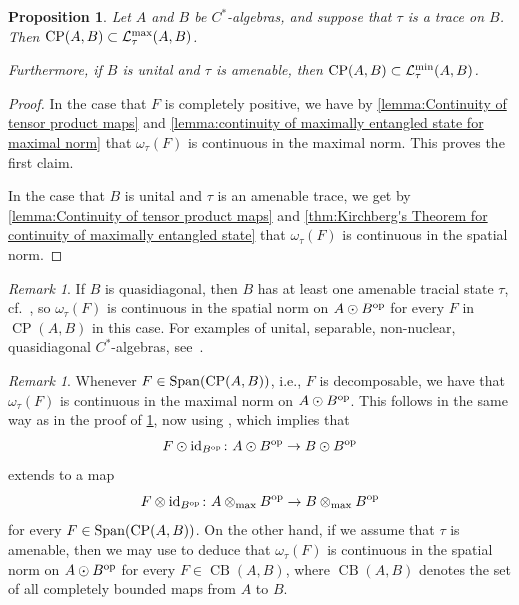 \documentclass[11pt, a4paper, oneside, final, reqno]{amsart}
\newcommand{\calL}{\mathcal{L}}
\newcommand{\CP}{\operatorname{CP}}
\newcommand{\CB}{\operatorname{CB}}
\theoremstyle{definition}
\theoremstyle{plain}
\newtheorem{proposition}[definition]{Proposition}
\theoremstyle{remark}
\newtheorem{remark}[definition]{Remark}
\numberwithin{equation}{section}
\begin{document}
\begin{proposition}\label{prop:cp maps have cont associated functional}
    Let $A$ and $B$ be $C^*$-algebras, and suppose that $\tau$ is a trace on $B$. Then $\CP(A,B) \subset \calL_\tau^{\rm max}(A,B)$.

    Furthermore, if $B$ is unital and $\tau$ is amenable, then $\CP(A,B) \subset \calL_\tau^{\rm min}(A,B)$.
\end{proposition}
\begin{proof}
    In the case that $F$ is completely positive, we have by \cref{lemma:Continuity of tensor product maps} and \cref{lemma:continuity of maximally entangled state for maximal norm} that $\omega_\tau(F)$ is continuous in the maximal norm. This proves the first claim.

    In the case that $B$ is unital and $\tau$ is an amenable trace, we get by \cref{lemma:Continuity of tensor product maps} and \cref{thm:Kirchberg's Theorem for continuity of maximally entangled state} that $\omega_\tau(F)$ is continuous in the spatial norm.
\end{proof}

\begin{remark}
    If $B$ is quasidiagonal, then $B$ has at least one amenable tracial state $\tau$, cf.~\cite[Proposition 7.1.16]{BO}, so $\omega_\tau(F)$ is continuous in the spatial norm on $A \odot B^{\rm op}$ for every $F$ in $\CP(A,B)$ in this case. For examples of unital, separable, non-nuclear, quasidiagonal $C^*$-algebras, see~\cite[Remark 7.3]{Pisier2020}.
\end{remark}

\begin{remark}
    Whenever $F \in {\rm Span}(\CP(A,B))$, i.e., $F$ is decomposable, we have that $\omega_\tau(F)$ is continuous in the maximal norm on $A \odot B^{\rm op}$. This follows in the same way as in the proof of \cref{prop:cp maps have cont associated functional}, now using \cite[Proposition 6.11]{GP}, which implies that
    \begin{equation*}
        F \odot \textup{id}_{B^\textup{op}} \colon A \odot B^\textup{op} \to B \odot B^\textup{op}
    \end{equation*}
    extends to a map
    \begin{equation*}
        F \otimes \textup{id}_{B^\textup{op}} \colon A \otimes_{\rm max} B^\textup{op} \to B \otimes_{\rm max} B^\textup{op}
    \end{equation*}
    for every $F \in {\rm Span}(\CP(A,B))$. On the other hand, if we assume that $\tau$ is amenable, then we may use \cite[Proposition 1.11]{GP} to deduce that $\omega_\tau(F)$ is continuous in the spatial norm on $A \odot B^{\rm op}$ for every $F \in \CB(A,B)$, where $\CB(A,B)$ denotes the set of all completely bounded maps from $A$ to $B$.
\end{remark}
\end{document}
